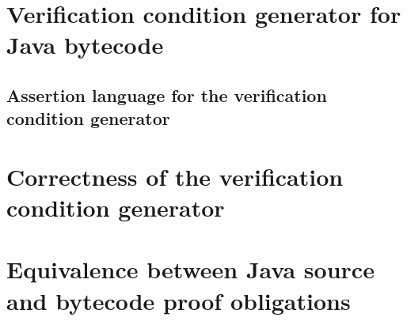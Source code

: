 \documentclass[book,10pt]{book}
\begin{document}
\chapter{Verification condition generator for Java bytecode } \label{wpGeneral}
  

\section{Assertion language for the verification condition generator}\label{assertLang}
  \label{assertLang}
  

  

   
 
   
  
   
  
  
  
   
  

\chapter{Correctness of the verification condition generator}\label{proofGeneral}
  
   
  
  
  



\chapter{Equivalence between Java source and bytecode proof obligations}\label{pogEquiv}
  
 
 
   
	 
  
   
  
  
\end{document}
